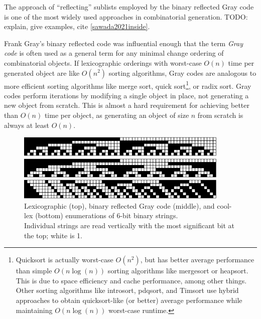 The approach of ``reflecting'' sublists employed by the binary reflected Gray code is one of the most widely used approaches in combinatorial generation. TODO: explain, give examples, cite \ref{sawada2021inside}.

Frank Gray's binary reflected code was influential enough that the term \emph{Gray code} is often used as a general term for any minimal change ordering of combinatorial objects.  If lexicographic orderings with worst-case $O(n)$ time per generated object are like $O(n^2)$ sorting algorithms, Gray codes are analogous to more efficient sorting algorithms like merge sort, quick sort\footnote{Quicksort is actually worst-case $O(n^2)$, but has better average performance than simple $O(n \log(n))$ sorting algorithms like mergesort or heapsort.  This is due to space efficiency and cache performance, among other things.  Other sorting algorithms like introsort, pdqsort, and Timsort use hybrid approaches to obtain quicksort-like (or better) average performance while maintaining $O(n \log(n))$ worst-case runtime.}, or radix sort.  Gray codes perform iterations by modifying a single object in place, not generating a new object from scratch.  This is almost a hard requirement for achieving better than $O(n)$ time per object, as generating an object of size $n$ from scratch is always at least $O(n)$.



\begin{figure}
    \centering
\includegraphics[width=4in]{BLX6-cropped.pdf} 

\includegraphics[width=4in]{BRGC6-cropped.pdf} 

\includegraphics[width=4in]{BCLX6-cropped.pdf} 

    \caption{Lexicographic (top), binary reflected Gray code (middle), and cool-lex (bottom) enumerations of 6-bit binary strings. \\ 
    Individual strings are read vertically with the most significant bit at the top; white is 1.
    }
    \label{binary}
\end{figure}

